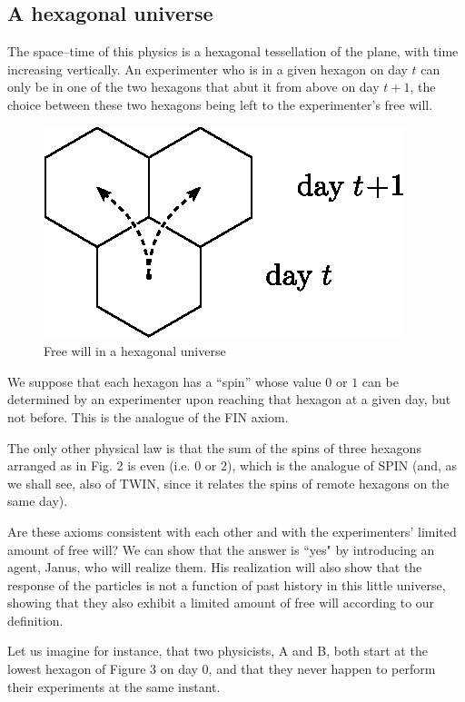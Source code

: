 \documentclass[12pt]{amsart}
\begin{document}
\subsection{A hexagonal universe}%

The space--time of this physics is a hexagonal tessellation of the
plane, with time increasing vertically.  An experimenter who is in a
given hexagon on day $t$ can only be in one of the two hexagons that abut it
from above on day $t+1$, the choice between these two hexagons being
left to the experimenter's free will.


\begin{figure}[!h]
\centering
\includegraphics{Hex1.eps}
\caption{Free will in a hexagonal universe}
\end{figure}

We suppose that each hexagon has a ``spin'' whose value $0$ or $1$
can be determined by an experimenter upon reaching that hexagon at a
given day, but not before.  This is the analogue of the FIN axiom.

The only other physical law is that the sum of the spins of three hexagons 
arranged as in Fig. 2 is even (i.e. $0$ or $2$), which is the analogue of 
SPIN (and, as we shall see, also of TWIN, since it relates the spins of
remote hexagons on the same day).  

Are these axioms consistent with each other and with the experimenters'
limited amount of free will?  We can show that the answer is ``yes"
by introducing an agent, Janus, who will realize them.  His realization
will also show that the response of the particles is not a function of past
history in this little universe, showing that they also exhibit a limited
amount of free will according to our definition.

Let us imagine for instance, that two physicists, A and B,
both start at the lowest hexagon of Figure 3 on day $0$,
and  that they never happen to perform their experiments at the same instant. 
 
\end{document}
